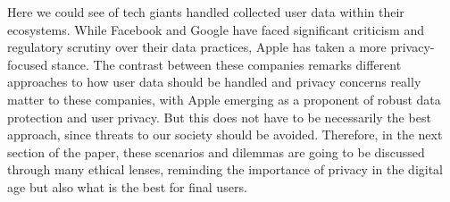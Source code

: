 Here we could see of tech giants handled collected user data within their ecosystems.
While Facebook and Google have faced significant criticism and regulatory scrutiny over their data practices, Apple has taken a more privacy-focused stance.
The contrast between these companies remarks different approaches to how user data should be handled and privacy concerns really matter to these companies, with Apple emerging as a proponent of robust data protection and user privacy.
But this does not have to be necessarily the best approach, since threats to our society should be avoided.
Therefore, in the next section of the paper, these scenarios and dilemmas are going to be discussed through many ethical lenses, reminding the importance of privacy in the digital age but also what is the best for final users.
